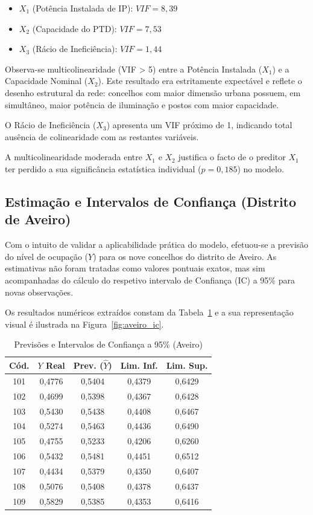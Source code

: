 \documentclass[conference]{IEEEtran}
\begin{document}
\begin{itemize}
    \item $X_1$ (Potência Instalada de IP): $VIF = 8{,}39$
    \item $X_2$ (Capacidade do PTD): $VIF = 7{,}53$
    \item $X_3$ (Rácio de Ineficiência): $VIF = 1{,}44$
\end{itemize}

Observa-se multicolinearidade (VIF > 5) entre a Potência Instalada ($X_1$) e a Capacidade Nominal ($X_2$). Este resultado era estritamente expectável e reflete o desenho estrutural da rede: concelhos com maior dimensão urbana possuem, em simultâneo, maior potência de iluminação e postos com maior capacidade. 

O Rácio de Ineficiência ($X_3$) apresenta um VIF próximo de 1, indicando total ausência de colinearidade com as restantes variáveis.

A multicolinearidade moderada entre $X_1$ e $X_2$ justifica o facto de o preditor $X_1$ ter perdido a sua significância estatística individual ($p = 0{,}185$) no modelo.

\subsection{Estimação e Intervalos de Confiança (Distrito de Aveiro)}

Com o intuito de validar a aplicabilidade prática do modelo, efetuou-se a previsão do nível de ocupação ($Y$) para os nove concelhos do distrito de Aveiro. As estimativas não foram tratadas como valores pontuais exatos, mas sim acompanhadas do cálculo do respetivo intervalo de Confiança (IC) a 95\% para novas observações.

Os resultados numéricos extraídos constam da Tabela~\ref{tab:aveiro_ic} e a sua representação visual é ilustrada na Figura~\ref{fig:aveiro_ic}.

\begin{table}[htbp]
\caption{Previsões e Intervalos de Confiança a 95\% (Aveiro)}
\begin{center}
\begin{tabular}{ccccc}
\toprule
\textbf{Cód.} & \textbf{$Y$ Real} & \textbf{Prev. ($\hat{Y}$)} & \textbf{Lim. Inf.} & \textbf{Lim. Sup.} \\
\midrule
101 & 0,4776 & 0,5404 & 0,4379 & 0,6429 \\
102 & 0,4699 & 0,5398 & 0,4367 & 0,6428 \\
103 & 0,5430 & 0,5438 & 0,4408 & 0,6467 \\
104 & 0,5274 & 0,5463 & 0,4436 & 0,6490 \\
105 & 0,4755 & 0,5233 & 0,4206 & 0,6260 \\
106 & 0,5432 & 0,5481 & 0,4451 & 0,6512 \\
107 & 0,4434 & 0,5379 & 0,4350 & 0,6407 \\
108 & 0,5076 & 0,5408 & 0,4378 & 0,6437 \\
109 & 0,5829 & 0,5385 & 0,4353 & 0,6416 \\
\bottomrule
\end{tabular}
\label{tab:aveiro_ic}
\end{center}
\end{table}
\end{document}

